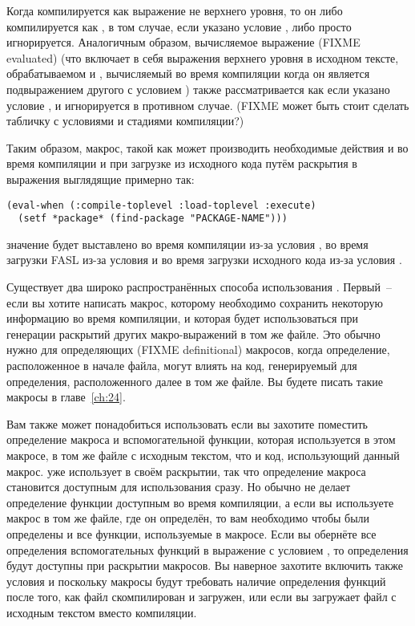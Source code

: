 Когда  компилируется как выражение не верхнего уровня, то он либо
компилируется как , в том случае, если указано условие , либо
просто игнорируется.  Аналогичным образом, вычисляемое выражение (FIXME evaluated)
 (что включает в себя выражения  верхнего уровня в
исходном тексте, обрабатываемом  и , вычисляемый во время
компиляции когда он является подвыражением другого  с условием
) также рассматривается как  если указано условие
, и игнорируется в противном случае. (FIXME может быть стоит сделать
табличку с условиями и стадиями компиляции?)

Таким образом, макрос, такой как  может производить необходимые действия
и во время компиляции и при загрузке из исходного кода путём раскрытия в выражения
 выглядящие примерно так:

\begin{lstlisting}
(eval-when (:compile-toplevel :load-toplevel :execute)
  (setf *package* (find-package "PACKAGE-NAME")))
\end{lstlisting}

значение  будет выставлено во время компиляции из-за условия
, во время загрузки FASL из-за условия  и во
время загрузки исходного кода из-за условия .

Существует два широко распространённых способа использования . Первый~--
если вы хотите написать макрос, которому необходимо сохранить некоторую информацию во
время компиляции, и которая будет использоваться при генерации раскрытий других
макро-выражений в том же файле.  Это обычно нужно для определяющих (FIXME definitional)
макросов, когда определение, расположенное в начале файла, могут влиять на код,
генерируемый для определения, расположенного далее в том же файле.  Вы будете писать такие
макросы в главе~\ref{ch:24}.

Вам также может понадобиться использовать  если вы захотите поместить
определение макроса и вспомогательной функции, которая используется в этом макросе, в том
же файле с исходным текстом, что и код, использующий данный макрос.  уже
использует  в своём раскрытии, так что определение макроса становится
доступным для использования сразу.  Но обычно  не делает определение функции
доступным во время компиляции, а если вы используете макрос в том же файле, где он
определён, то вам необходимо чтобы были определены и все функции, используемые в
макросе. Если вы обернёте все определения вспомогательных функций в выражение
 с условием , то определения будут доступны при
раскрытии макросов. Вы наверное захотите включить также условия  и
 поскольку макросы будут требовать наличие определения функций после того,
как файл скомпилирован и загружен, или если вы загружает файл с исходным текстом вместо
компиляции.

